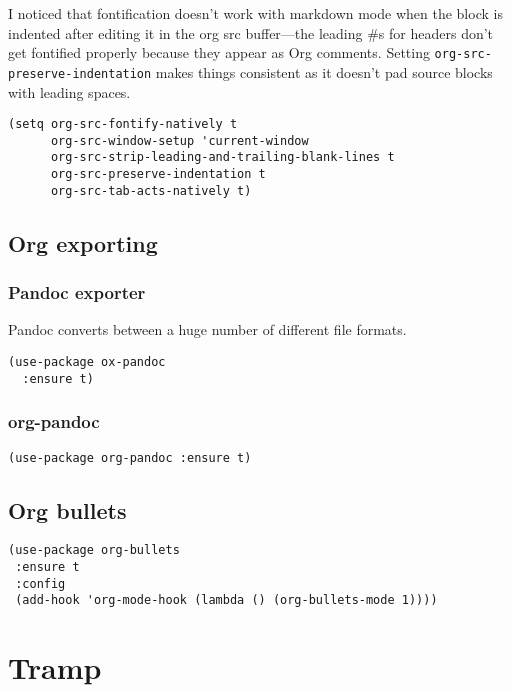 \documentclass[11pt]{article}
\begin{document}
I noticed that fontification doesn't work with markdown mode when the
block is indented after editing it in the org src buffer---the leading
\#s for headers don't get fontified properly because they appear as Org
comments. Setting \verb~org-src-preserve-indentation~ makes things
consistent as it doesn't pad source blocks with leading spaces.

\begin{verbatim}
(setq org-src-fontify-natively t
      org-src-window-setup 'current-window
      org-src-strip-leading-and-trailing-blank-lines t
      org-src-preserve-indentation t
      org-src-tab-acts-natively t)
\end{verbatim}

\subsection{Org exporting}
\label{sec-10-6}

\subsubsection{Pandoc exporter}
\label{sec-10-6-1}

Pandoc converts between a huge number of different file formats. 

\begin{verbatim}
(use-package ox-pandoc
  :ensure t)
\end{verbatim}

\subsubsection{org-pandoc}
\label{sec-10-6-2}

\begin{verbatim}
(use-package org-pandoc :ensure t)
\end{verbatim}

\subsection{Org bullets}
\label{sec-10-7}

\begin{verbatim}
(use-package org-bullets
 :ensure t
 :config
 (add-hook 'org-mode-hook (lambda () (org-bullets-mode 1))))
\end{verbatim}
\section{Tramp}
\label{sec-11}
\end{document}
